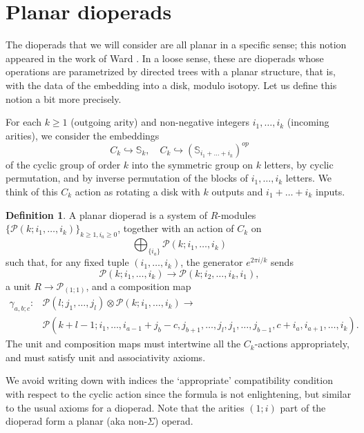 \documentclass[11pt,a4paper]{amsart}
\renewcommand{\SS}{\ensuremath{\mathbb{S}}}
\newcommand{\scrP}{\mathscr{P}}
\theoremstyle{definition}
\newtheorem{definition}{Definition}
\begin{document}
\section{Planar dioperads}\label{sec:planar}
\noindent The dioperads that we will consider are all planar in a specific sense; this notion appeared in the work of Ward \cite{ward2019six}. In a loose sense, these are dioperads whose operations are parametrized by directed trees with a planar structure, that is, with the data of the embedding into a disk, modulo isotopy. Let us define this notion a bit more precisely.

For each $k \ge 1$ (outgoing arity) and non-negative integers $i_1,\dots,i_k$ (incoming arities), 
we consider the embeddings
\[ C_k \hookrightarrow \SS_k, \quad C_k \hookrightarrow (\SS_{i_1+\dots+i_k})^{op} \]
of the cyclic group of order $k$ into the symmetric group on $k$ letters, by cyclic permutation, and by inverse permutation of the blocks of $i_1,\dots,i_k$ letters. We think of this $C_k$ action as rotating a disk with $k$ outputs and $i_1 + \dots + i_k$ inputs.
\begin{definition}
    A planar dioperad is a system of $R$-modules $\{\scrP{(k;i_1,\dots,i_k)}\}_{k \ge 1, i_a \ge 0}$, 
    together with an action of $C_k$ on
    \[ \bigoplus_{\{i_a\}} \scrP{(k;i_1,\dots,i_k)} \]
    such that, for any fixed tuple $(i_1,\dots,i_k)$, the generator $e^{2\pi i/k}$ sends 
    \[ \scrP{(k;i_1,\dots,i_k)} \to \scrP{(k;i_2,\dots,i_k,i_1)}, \]
    a unit $R \to \scrP_{(1;1)}$, and a composition map
    \begin{align*} 
        \gamma_{a,b;c} \colon &\scrP{(l;j_1,\dots,j_l)} \otimes \scrP{(k;i_1,\dots,i_k)} \to \\
        &\scrP(k+l-1;i_1,\dots,i_{a-1} + j_b - c,j_{b+1},\dots,j_l,j_1,\dots,j_{b-1},c+ i_a, i_{a+1},\dots,i_k).
    \end{align*}
    The unit and composition maps must intertwine all the $C_k$-actions appropriately, and must satisfy unit and associativity axioms.
\end{definition}

\noindent We avoid writing down with indices the `appropriate' compatibility condition with respect to the cyclic action since the formula is not enlightening, but similar to the usual axioms for a dioperad. Note that the arities $(1;i)$ part of the dioperad form a planar (aka non-$\Sigma$) operad.  
\end{document}
